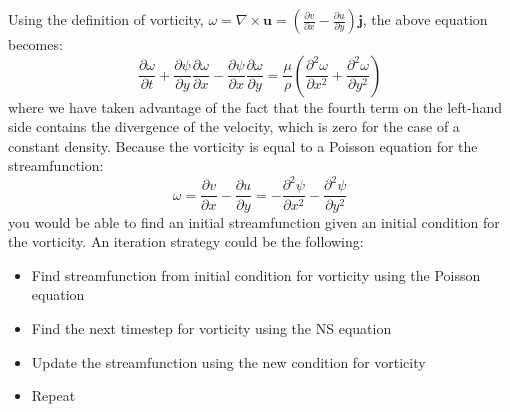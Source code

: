 \documentclass{article}
\begin{document}
Using the definition of vorticity, $\omega =\nabla \times \textbf{u}=\left( \frac{\partial v}{\partial x} -\frac{\partial u}{\partial y} \right)  \textbf{j}$, the above equation becomes:
$$\frac{\partial \omega }{\partial t} +\frac{\partial \psi }{\partial y} \frac{\partial \omega }{\partial x} -\frac{\partial \psi }{\partial x} \frac{\partial \omega }{\partial y} =\frac{\mu }{\rho } \left( \frac{\partial^{2} \omega }{\partial x^{2}} +\frac{\partial^{2} \omega }{\partial y^{2}} \right)  $$
where we have taken advantage of the fact that the fourth term on the left-hand side contains the divergence of the velocity, which is zero for the case of a constant density. Because the vorticity is equal to a Poisson equation for the streamfunction:
$$\omega =\frac{\partial v}{\partial x} -\frac{\partial u}{\partial y} =-\frac{\partial^{2} \psi }{\partial x^{2}} -\frac{\partial^{2} \psi }{\partial y^{2}} $$
you would be able to find an initial streamfunction given an initial condition for the vorticity. An iteration strategy could be the following:
\begin{itemize}
	\item Find streamfunction from initial condition for vorticity using the Poisson equation
	\item Find the next timestep for vorticity using the NS equation
	\item Update the streamfunction using the new condition for vorticity
	\item Repeat
\end{itemize}
\end{document}
